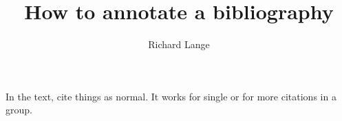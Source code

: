\documentclass[11pt]{article}
\title{How to annotate a bibliography}
\author{Richard Lange}
\begin{document}

\maketitle

In the text, cite things as normal\cite{latexcompanion}. It works for single\cite{einstein} or for more\cite{knuthwebsite,latexcompanion} citations in a group.


\renewcommand{\refname}{References and recommended reading}





\end{document}
